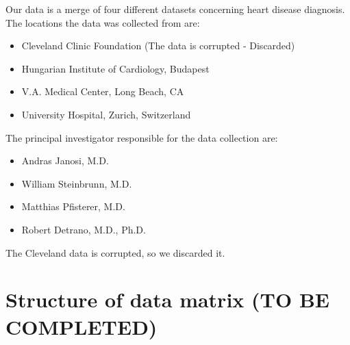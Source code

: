 \documentclass[a4paper,12pt]{article}
\begin{document}
    Our data is a merge of four different datasets concerning heart disease diagnosis. The locations the data was collected from are:
    
    \begin{itemize}
    
        \item Cleveland Clinic Foundation (The data is corrupted - Discarded)
        \item Hungarian Institute of Cardiology, Budapest
        \item V.A. Medical Center, Long Beach, CA
        \item University Hospital, Zurich, Switzerland
        
    \end{itemize}
    
    The principal investigator responsible for the data collection are:
    
    \begin{itemize}
    
        \item Andras Janosi, M.D.
        \item William Steinbrunn, M.D.
        \item Matthias Pfisterer, M.D.
        \item Robert Detrano, M.D., Ph.D.
        
    \end{itemize}
    
    The Cleveland data is corrupted, so we discarded it.

\section{Structure of data matrix (\textbf{TO BE COMPLETED})} 
\end{document}
